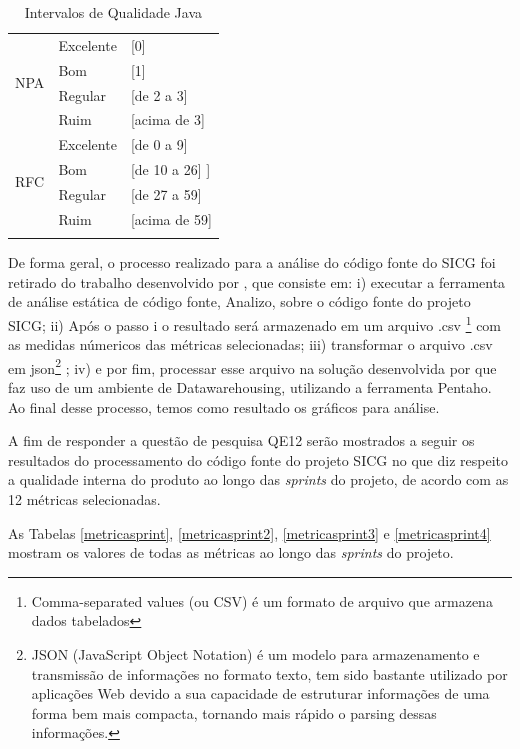 \begin{longtable}{|l|l|l|}
		 \multirow{4}{*}{NPA} 
		 & Excelente & [0]   \\
		 & Bom & [1]   \\
		 & Regular & [de 2 a 3]   \\
		 & Ruim & [acima de 3]  \\ \hline


		 \multirow{4}{*}{RFC} 
		 & Excelente & [de 0 a 9]   \\
		 & Bom & [de 10 a 26]  ] \\
		 & Regular & [de 27 a 59]   \\
		 & Ruim & [acima de 59]   \\ \hline
 	

			\caption{Intervalos de Qualidade Java}
\label{intervalos}
	\end{longtable}

De forma geral, o processo realizado para a análise do código fonte do SICG foi retirado do trabalho desenvolvido por , que  consiste em: i) executar a ferramenta de análise estática de código fonte, Analizo, sobre o código fonte do projeto SICG; ii) Após o passo i o resultado será armazenado em um arquivo .csv \footnote{Comma-separated values (ou CSV) é um formato de arquivo que armazena dados tabelados} com as medidas númericos das métricas selecionadas; iii) transformar o arquivo .csv em json\footnote{JSON (JavaScript Object Notation) é um modelo para armazenamento e transmissão de informações no formato texto, tem sido bastante utilizado por aplicações Web devido a sua capacidade de estruturar informações de uma forma bem mais compacta, tornando mais rápido o parsing dessas informações.} ; iv) e por fim, processar esse arquivo na solução desenvolvida por  que faz uso de um ambiente de Datawarehousing, utilizando a ferramenta Pentaho. Ao final desse processo, temos como resultado os gráficos para análise. 

A fim de responder a questão de pesquisa QE12 serão mostrados a seguir os resultados do processamento do código fonte do projeto SICG no que diz respeito a qualidade interna do produto ao longo das \textit{sprints} do projeto, de acordo com as 12 métricas selecionadas.

As Tabelas \ref{metricasprint}, \ref{metricasprint2}, \ref{metricasprint3} e \ref{metricasprint4} mostram os valores de todas as métricas ao longo das \textit{sprints} do projeto.


